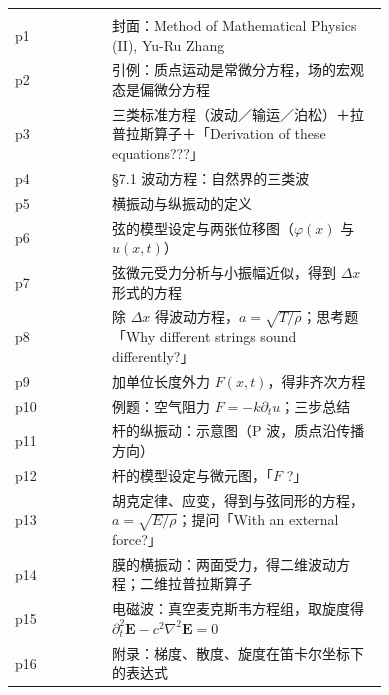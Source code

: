\documentclass[11pt]{ctexart}
\renewcommand{\thead}[1]{\leavevmode{\bfseries\color{violetdeep}#1}}
\newcommand{\tabmidrule}{\noalign{\vspace{1pt}{\color{petal}\hrule height 0.5pt}\vspace{1pt}}}
\let\origsubhdr\subhdr
\renewcommand{\subhdr}[1]{\par\needspace{3\baselineskip}\origsubhdr{#1}}
\begin{document}

\begin{minipage}{\linewidth}
\small
\tabtop
\begin{tabular}{@{}l p{0.74\linewidth}@{}}
\thead{课件页} & \thead{内容} \\
\tabmidrule
p1 & 封面：Method of Mathematical Physics (II), Yu-Ru Zhang \\
p2 & 引例：质点运动是常微分方程，场的宏观态是偏微分方程 \\
p3 & 三类标准方程（波动／输运／泊松）＋拉普拉斯算子＋「Derivation of these equations???」 \\
p4 & §7.1 波动方程：自然界的三类波 \\
p5 & 横振动与纵振动的定义 \\
p6 & 弦的模型设定与两张位移图（$\varphi(x)$ 与 $u(x,t)$） \\
p7 & 弦微元受力分析与小振幅近似，得到 $\Delta x$ 形式的方程 \\
p8 & 除 $\Delta x$ 得波动方程，$a=\sqrt{T/\rho}$；思考题「Why different strings sound differently?」 \\
p9 & 加单位长度外力 $F(x,t)$，得非齐次方程 \\
p10 & 例题：空气阻力 $F=-k\partial_t u$；三步总结 \\
p11 & 杆的纵振动：示意图（P 波，质点沿传播方向） \\
p12 & 杆的模型设定与微元图，「$F$ ?」 \\
p13 & 胡克定律、应变，得到与弦同形的方程，$a=\sqrt{E/\rho}$；提问「With an external force?」 \\
p14 & 膜的横振动：两面受力，得二维波动方程；二维拉普拉斯算子 \\
p15 & 电磁波：真空麦克斯韦方程组，取旋度得 $\partial_t^2\mathbf E-c^2\nabla^2\mathbf E=0$ \\
p16 & 附录：梯度、散度、旋度在笛卡尔坐标下的表达式 \\
\end{tabular}
\tabbot
\end{minipage}


\end{document}

